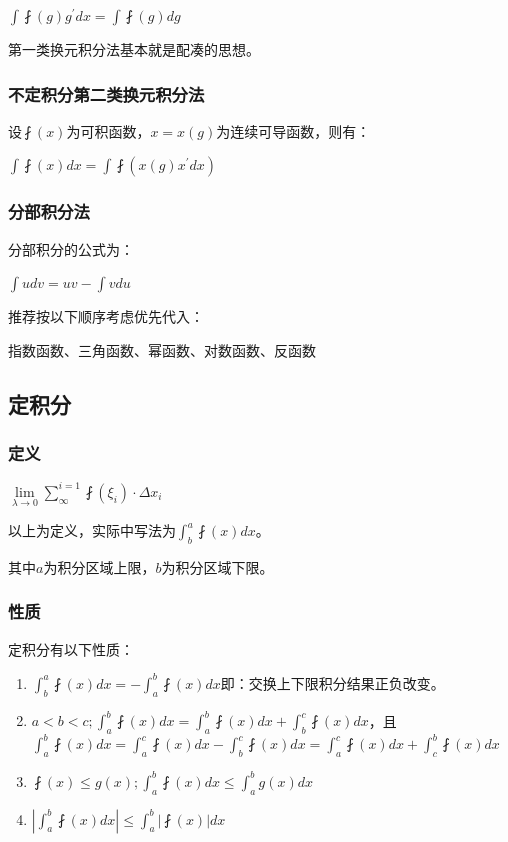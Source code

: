 \documentclass[UTF8]{ctexbook}
\newcommand{\limNormal}[1]{\lim\limits_{#1}}
\newcommand{\derivative}{^\prime}
\newcommand{\UpDownSum}[2]{\sum\limits_{#1}^{#2}}
\newcommand{\defFunction}[1]{\fint(#1)}
\newcommand{\definiteIntegral}[2]{\int^{#1}_{#2}}
\begin{document}
{{{{    $\int \defFunction{g}g\derivative dx = \int \defFunction{g}dg$

    第一类换元积分法基本就是配凑的思想。

  }%

  \subsubsection{不定积分第二类换元积分法}{
    设$\defFunction{x}$为可积函数，$x = x(g)$为连续可导函数，则有：

    $\int \defFunction{x}dx = \int \defFunction{x(g)x\derivative dx}$

  }%

  \subsubsection{分部积分法}{
    分部积分的公式为：

    $\int udv = uv - \int v du$

    推荐按以下顺序考虑优先代入：

    指数函数、三角函数、幂函数、对数函数、反函数
  }%

}%

\subsection{定积分}{

\subsubsection{定义}{
  $\limNormal{\lambda \to 0}\UpDownSum{\infty}{i = 1}\defFunction{\xi_i}\cdot\Delta x_i$

  以上为定义，实际中写法为$\definiteIntegral{a}{b}\defFunction{x}dx$。

  其中$a$为积分区域上限，$b$为积分区域下限。
}%

\subsubsection{性质}{
  定积分有以下性质：
  \begin{enumerate}
    \item $\definiteIntegral{a}{b}\defFunction{x}dx = -\definiteIntegral{b}{a}\defFunction{x}dx$即：交换上下限积分结果正负改变。
    \item $a < b < c; \definiteIntegral{b}{a}\defFunction{x}dx = \definiteIntegral{b}{a}\defFunction{x}dx + \definiteIntegral{c}{b}\defFunction{x}dx$，且$\definiteIntegral{b}{a}\defFunction{x}dx = \definiteIntegral{c}{a}\defFunction{x}dx - \definiteIntegral{c}{b}\defFunction{x}dx = \definiteIntegral{c}{a}\defFunction{x}dx + \definiteIntegral{b}{c}\defFunction{x}dx$
    \item $\defFunction{x} \leq g(x); \definiteIntegral{b}{a}\defFunction{x}dx \leq \definiteIntegral{b}{a}g(x)dx$
    \item $|\definiteIntegral{b}{a}\defFunction{x}dx|\leq\definiteIntegral{b}{a}|\defFunction{x}|dx$
  \end{enumerate}
}%

}}}
\end{document}
